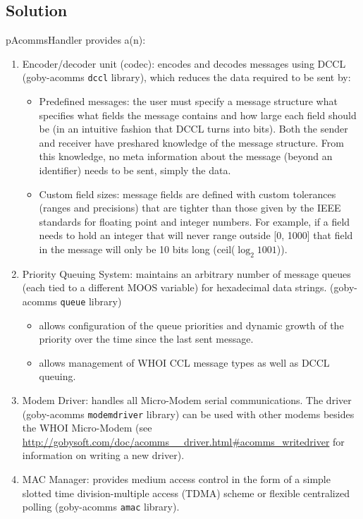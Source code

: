 \documentclass[11pt, letterpaper, oneside]{memoir}
\begin{document}
\subsection{Solution}
pAcommsHandler provides a(n):
\begin{enumerate}
\item Encoder/decoder unit (codec): encodes and decodes messages using DCCL (goby-acomms \verb|dccl| library), which reduces the data required to be sent by:
\begin{itemize}
\item Predefined messages: the user must specify a message structure what specifies what fields the message contains and how large each field should be (in an intuitive fashion that DCCL turns into bits). Both the sender and receiver have preshared knowledge of the message structure. From this knowledge, no meta information about the message (beyond an identifier) needs to be sent, simply the data. 
\item Custom field sizes: message fields are defined with custom tolerances (ranges and precisions) that are tighter than those given by the IEEE standards for floating point and integer numbers. For example, if a field needs to hold an integer that will never range outside [0, 1000] that field in the message will only be 10 bits long (ceil($\log_2{1001}$)).
\end{itemize}
\item Priority Queuing System: maintains an arbitrary number of message queues (each tied to a different MOOS variable) for hexadecimal data strings. (goby-acomms \verb|queue| library)
\begin{itemize} 
\item allows configuration of the queue priorities and dynamic growth of the priority over the time since the last sent message.
\item allows management of WHOI CCL message types as well as DCCL queuing. 
\end{itemize}
\item Modem Driver: handles all Micro-Modem serial communications. The driver (goby-acomms \verb|modemdriver| library) can be used with other modems besides the WHOI Micro-Modem (see \url{http://gobysoft.com/doc/acomms__driver.html#acomms_writedriver} for information on writing a new driver). 
\item MAC Manager: provides medium access control in the form of a simple slotted time division-multiple access (TDMA) scheme or flexible centralized polling (goby-acomms \verb|amac| library).
\end{enumerate}
\end{document}
